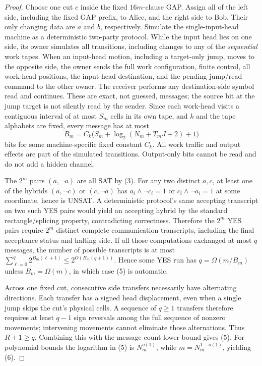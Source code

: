 \documentclass[11pt]{article}
\begin{document}
\begin{proof}
Choose one cut $c$ inside the fixed $16m$-clause GAP. Assign all of the left side, including the fixed GAP prefix, to Alice, and the right side to Bob. Their only changing data are $a$ and $b$, respectively. Simulate the single-input-head machine as a deterministic two-party protocol. While the input head lies on one side, its owner simulates all transitions, including changes to any of the \emph{sequential} work tapes. When an input-head motion, including a target-only jump, moves to the opposite side, the owner sends the full work configuration, finite control, all work-head positions, the input-head destination, and the pending jump/read command to the other owner. The receiver performs any destination-side symbol read and continues. These are exact, not guessed, messages; the source bit at the jump target is not silently read by the sender. Since each work-head visits a contiguous interval of at most $S_m$ cells in its own tape, and $k$ and the tape alphabets are fixed, every message has at most
\[
 B_m=C_k\bigl(S_m+\log_2(N_m+T_mJ+2)+1\bigr)
\tag{7}
\]
bits for some machine-specific fixed constant $C_k$. All work traffic and output effects are part of the simulated transitions. Output-only bits cannot be read and do not add a hidden channel.

The $2^m$ pairs $(a,\neg a)$ are all SAT by (3). For any two distinct $a,c$, at least one of the hybrids $(a,\neg c)$ or $(c,\neg a)$ has $a_i\wedge\neg c_i=1$ or $c_i\wedge\neg a_i=1$ at some coordinate, hence is UNSAT. A deterministic protocol's same accepting transcript on two such YES pairs would yield an accepting hybrid by the standard rectangle/splicing property, contradicting correctness. Therefore the $2^m$ YES pairs require $2^m$ distinct complete communication transcripts, including the final acceptance status and halting side. If all those computations exchanged at most $q$ messages, the number of possible transcripts is at most $\sum_{\ell=0}^{q}2^{B_m(\ell+1)}\le2^{O(B_m(q+1))}$. Hence some YES run has $q=\Omega(m/B_m)$ unless $B_m=\Omega(m)$, in which case (5) is automatic.

Across one fixed cut, consecutive side transfers necessarily have alternating directions. Each transfer has a signed head displacement, even when a single jump skips the cut's physical cells. A sequence of $q\ge1$ transfers therefore requires at least $q-1$ sign reversals among the full sequence of nonzero movements; intervening movements cannot eliminate those alternations. Thus $R+1\ge q$. Combining this with the message-count lower bound gives (5). For polynomial bounds the logarithm in (5) is $N_m^{o(1)}$, while $m=N_m^{1-o(1)}$, yielding (6).\end{proof}
\end{document}
